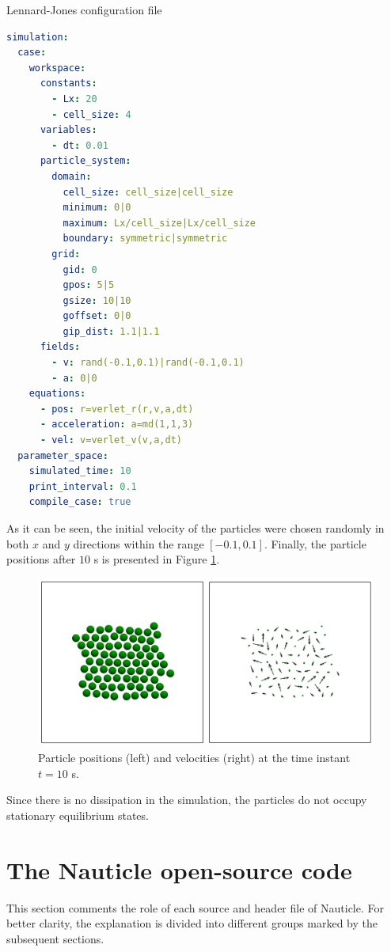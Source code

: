 \documentclass[a4paper,12pt,openany]{book}
\theoremstyle{break}
\begin{document}
\begin{samepage}
\begin{example}{Lennard-Jones configuration file}{}
\lstset{basicstyle=\tiny}
\begin{lstlisting}[language=YAML]
simulation:
  case:
    workspace:
      constants:
        - Lx: 20
        - cell_size: 4
      variables:
        - dt: 0.01
      particle_system:
        domain:
          cell_size: cell_size|cell_size
          minimum: 0|0
          maximum: Lx/cell_size|Lx/cell_size
          boundary: symmetric|symmetric
        grid:
          gid: 0
          gpos: 5|5
          gsize: 10|10
          goffset: 0|0
          gip_dist: 1.1|1.1
      fields:
        - v: rand(-0.1,0.1)|rand(-0.1,0.1)
        - a: 0|0
    equations:
      - pos: r=verlet_r(r,v,a,dt)
      - acceleration: a=md(1,1,3)
      - vel: v=verlet_v(v,a,dt)
  parameter_space:
    simulated_time: 10
    print_interval: 0.1
    compile_case: true
\end{lstlisting}
\end{example}
\end{samepage}
As it can be seen, the initial velocity of the particles were chosen randomly in both $x$ and $y$ directions within the range $[-0.1,0.1]$. Finally, the particle positions after $10$ s is presented in Figure \ref{fig:MD_results}.
\begin{figure}[H]
  \includegraphics[scale=0.3]{md_results.pdf}
  \centering
  \caption{Particle positions (left) and velocities (right) at the time instant $t=10$ s.}
  \label{fig:MD_results}
\end{figure}\vspace*{3pt}
Since there is no dissipation in the simulation, the particles do not occupy stationary equilibrium states.

\section{The Nauticle open-source code}
This section comments the role of each source and header file of Nauticle. For better clarity, the explanation is divided into different groups marked by the subsequent sections.
\end{document}
